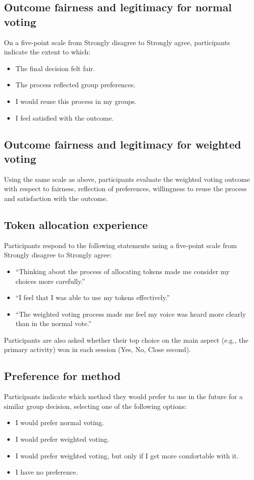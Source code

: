 \subsection*{Outcome fairness and legitimacy for normal voting}
On a five‑point scale from Strongly disagree to Strongly agree, participants
indicate the extent to which:
\begin{itemize}
    \item The final decision felt fair.
    \item The process reflected group preferences.
    \item I would reuse this process in my groups.
    \item I feel satisfied with the outcome.
\end{itemize}

\subsection*{Outcome fairness and legitimacy for weighted voting}
Using the same scale as above, participants evaluate the weighted voting
outcome with respect to fairness, reflection of preferences, willingness to
reuse the process and satisfaction with the outcome.

\subsection*{Token allocation experience}
Participants respond to the following statements using a five‑point scale
from Strongly disagree to Strongly agree:
\begin{itemize}
    \item ``Thinking about the process of allocating tokens made me
    consider my choices more carefully.''
    \item ``I feel that I was able to use my tokens effectively.''
    \item ``The weighted voting process made me feel my voice was heard
    more clearly than in the normal vote.''
\end{itemize}
Participants are also asked whether their top choice on the main aspect
(e.g., the primary activity) won in each session (Yes, No, Close
second).

\subsection*{Preference for method}
Participants indicate which method they would prefer to use in the future
for a similar group decision, selecting one of the following options:
\begin{itemize}
    \item I would prefer normal voting.
    \item I would prefer weighted voting.
    \item I would prefer weighted voting, but only if I get more
    comfortable with it.
    \item I have no preference.
\end{itemize}

